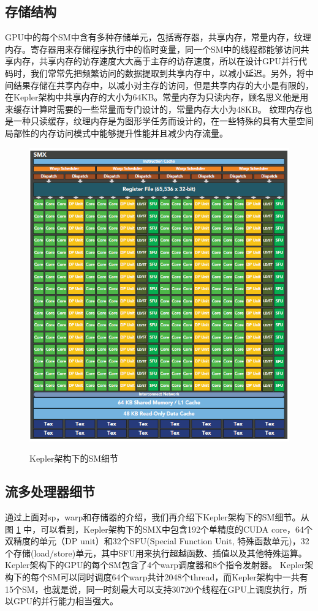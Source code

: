 \subsection{存储结构}
GPU中的每个SM中含有多种存储单元，包括寄存器，共享内存，常量内存，纹理内存。寄存器用来存储程序执行中的临时变量，同一个SM中的线程都能够访问共享内存，共享内存的访存速度大大高于主存的访存速度，所以在设计GPU并行代码时，我们常常先把频繁访问的数据提取到共享内存中，以减小延迟。另外，将中间结果存储在共享内存中，以减小对主存的访问，但是共享内存的大小是有限的，在Kepler架构中共享内存的大小为64KB。常量内存为只读内存，顾名思义他是用来缓存计算时需要的一些常量而专门设计的，常量内存大小为48KB。 纹理内存也是一种只读缓存，纹理内存是为图形学任务而设计的，在一些特殊的具有大量空间局部性的内存访问模式中能够提升性能并且减少内存流量。
\begin{figure}
\setlength{\belowcaptionskip}{-0.5cm}
\begin{center}
{\includegraphics[width=1 \textwidth]{figures/smx.png}}
\end{center}
\caption{{\footnotesize{Kepler架构下的SM细节}}}
\label{sm}
\end{figure}
\subsection{流多处理器细节}
通过上面对sp，warp和存储器的介绍，我们再介绍下Kepler架构下的SM细节。从图 \ref{sm} 中，可以看到，Kepler架构下的SMX中包含192个单精度的CUDA core，64个双精度的单元（DP unit）和32个SFU(Special Function Unit, 特殊函数单元)，32个存储(load/store)单元，其中SFU用来执行超越函数、插值以及其他特殊运算。Kepler架构下的GPU的每个SM包含了4个warp调度器和8个指令发射器。 Kepler架构下的每个SM可以同时调度64个warp共计2048个thread，而Kepler架构中一共有15个SM，也就是说，同一时刻最大可以支持30720个线程在GPU上调度执行，所以GPU的并行能力相当强大。

